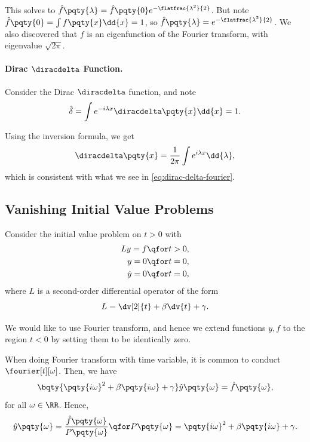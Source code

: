 This solves to \(\hat{f}\pqty{\lambda} = \hat{f} \pqty{0} e^{-\flatfrac{\lambda^2}{2}}\). But note \(\hat{f}\pqty{0} = \int f\pqty{x} \dd{x} = 1\), so \(\hat{f}\pqty{\lambda} = e^{-\flatfrac{\lambda^2}{2}}\). We also discovered that \(f\) is an eigenfunction of the Fourier transform, with eigenvalue \(\sqrt{2 \pi}\).

\paragraph{Dirac \(\diracdelta\) Function.} Consider the Dirac \(\diracdelta\) function, and note
\begin{equation}
    \hat{\delta} = \int e^{- i \lambda x} \diracdelta\pqty{x} \dd{x} = 1.
\end{equation}

Using the inversion formula, we get
\begin{equation}
    \diracdelta\pqty{x} = \frac{1}{2 \pi} \int e^{i \lambda x} \dd{\lambda},
\end{equation}
which is consistent with what we see in \eqref{eq:dirac-delta-fourier}.

\subsection{Vanishing Initial Value Problems}

Consider the initial value problem on \(t > 0\) with
\begin{subequations}
    \begin{align}
        Ly = f &\qfor t > 0, \\
        y = 0 &\qfor t = 0, \\
        \dot{y} = 0 &\qfor t = 0,
    \end{align}
\end{subequations}
where \(L\) is a second-order differential operator of the form
\begin{equation}
    L = \dv[2]{t} + \beta \dv{t} + \gamma.
\end{equation}

We would like to use Fourier transform, and hence we extend functions \(y, f\) to the region \(t < 0\) by setting them to be identically zero.

When doing Fourier transform with time variable, it is common to conduct \(\fourier[t][\omega]\). Then, we have
\begin{equation}
    \bqty{\pqty{i \omega}^2 + \beta \pqty{i \omega} + \gamma} \hat{y}\pqty{\omega} = \hat{f}\pqty{\omega},
\end{equation}
for all \(\omega \in \RR\). Hence,
\begin{equation}
    \hat{y} \pqty{\omega} = \frac{\hat{f}\pqty{\omega}}{P\pqty{\omega}} \qfor P\pqty{\omega} = \pqty{i \omega}^2 + \beta \pqty{i \omega} + \gamma.
\end{equation}

